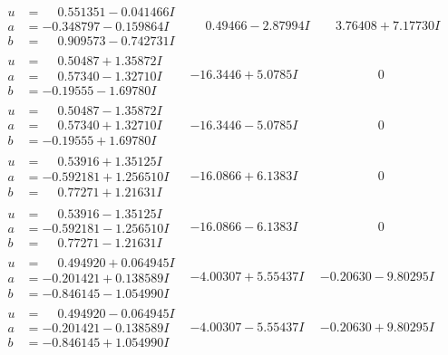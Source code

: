 \documentclass[1p]{elsarticle_modified}
\theoremstyle{definition}
\begin{document}
$$\begin{array}{c|c|c}
\begin{aligned}
u &= \phantom{-}0.551351 - 0.041466 I \\
a &= -0.348797 - 0.159864 I \\
b &= \phantom{-}0.909573 - 0.742731 I\end{aligned}
 & \phantom{-}0.49466 - 2.87994 I & \phantom{-}3.76408 + 7.17730 I \\ \hline\begin{aligned}
u &= \phantom{-}0.50487 + 1.35872 I \\
a &= \phantom{-}0.57340 - 1.32710 I \\
b &= -0.19555 - 1.69780 I\end{aligned}
 & -16.3446 + 5.0785 I & \phantom{-0.000000 } 0 \\ \hline\begin{aligned}
u &= \phantom{-}0.50487 - 1.35872 I \\
a &= \phantom{-}0.57340 + 1.32710 I \\
b &= -0.19555 + 1.69780 I\end{aligned}
 & -16.3446 - 5.0785 I & \phantom{-0.000000 } 0 \\ \hline\begin{aligned}
u &= \phantom{-}0.53916 + 1.35125 I \\
a &= -0.592181 + 1.256510 I \\
b &= \phantom{-}0.77271 + 1.21631 I\end{aligned}
 & -16.0866 + 6.1383 I & \phantom{-0.000000 } 0 \\ \hline\begin{aligned}
u &= \phantom{-}0.53916 - 1.35125 I \\
a &= -0.592181 - 1.256510 I \\
b &= \phantom{-}0.77271 - 1.21631 I\end{aligned}
 & -16.0866 - 6.1383 I & \phantom{-0.000000 } 0 \\ \hline\begin{aligned}
u &= \phantom{-}0.494920 + 0.064945 I \\
a &= -0.201421 + 0.138589 I \\
b &= -0.846145 - 1.054990 I\end{aligned}
 & -4.00307 + 5.55437 I & -0.20630 - 9.80295 I \\ \hline\begin{aligned}
u &= \phantom{-}0.494920 - 0.064945 I \\
a &= -0.201421 - 0.138589 I \\
b &= -0.846145 + 1.054990 I\end{aligned}
 & -4.00307 - 5.55437 I & -0.20630 + 9.80295 I \\ \hline\begin{aligned}

\end{aligned}
\end{array}$$
\end{document}
